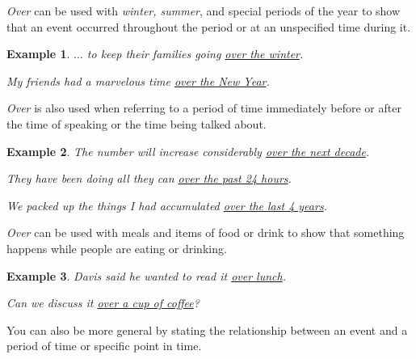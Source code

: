 \documentclass[oneside]{book}
\numberwithin{equation}{section}
\newtheorem{example}{Example}[section]
\begin{document}
%
\noindent{} \textit{Over} can be used with \textit{winter, summer}, and special periods of the year to show that an event occurred throughout the period or at an unspecified time during it.
\begin{example}
    $\ldots$ to keep their families going \underline{over the winter}.
    
    My friends had a marvelous time \underline{over the New Year}.
\end{example}
\textit{Over} is also used when referring to a period of time immediately before or after the time of speaking or the time being talked about.
\begin{example}
    The number will increase considerably \underline{over the next decade}.
    
    They have been doing all they can \underline{over the past 24 hours}.
    
    We packed up the things I had accumulated \underline{over the last 4 years}.
\end{example}
\textit{Over} can be used with meals and items of food or drink to show that something happens while people are eating or drinking.
\begin{example}
    Davis said he wanted to read it \underline{over lunch}.
    
    Can we discuss it \underline{over a cup of coffee}?
\end{example}
%
\noindent{} You can also be more general by stating the relationship between an event and a period of time or specific point in time.
\end{document}
